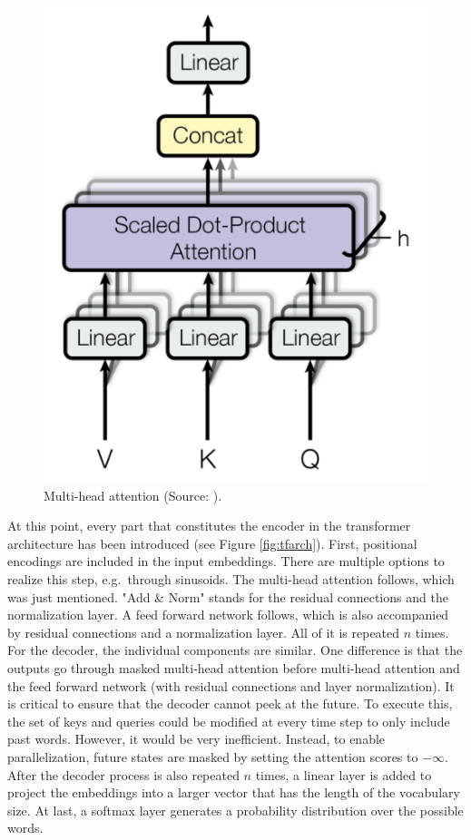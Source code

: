 \documentclass[
]{krantz}
\begin{document}
\begin{figure}

{\centering \includegraphics[width=0.34\linewidth]{./figures/01-01-nlp/transformers_multi-head-attention2_vaswani} 

}

\caption{Multi-head attention (Source: \citet{Vaswani2017}).}\label{fig:tfmha}
\end{figure}



At this point, every part that constitutes the encoder in the
transformer architecture has been introduced (see Figure \ref{fig:tfarch}). First, positional
encodings are included in the input embeddings. There are multiple
options to realize this step, e.g.~through sinusoids. The multi-head
attention follows, which was just mentioned. "Add \& Norm" stands for
the residual connections and the normalization layer. A feed forward
network follows, which is also accompanied by residual connections and a
normalization layer. All of it is repeated \(n\) times. For the decoder,
the individual components are similar. One difference is that the
outputs go through masked multi-head attention before multi-head
attention and the feed forward network (with residual connections and
layer normalization). It is critical to ensure that the decoder cannot
peek at the future. To execute this, the set of keys and queries could
be modified at every time step to only include past words. However, it
would be very inefficient. Instead, to enable parallelization, future
states are masked by setting the attention scores to \(-\infty\). After
the decoder process is also repeated \(n\) times, a linear layer is added
to project the embeddings into a larger vector that has the length of
the vocabulary size. At last, a softmax layer generates a probability
distribution over the possible words.
\end{document}

